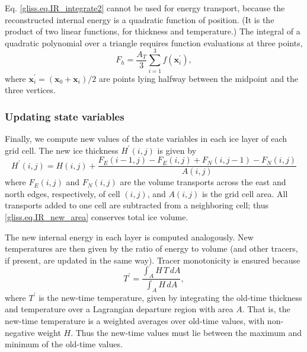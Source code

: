 Eq. \eqref{gliss.eq.IR_integrate2} cannot be used for energy transport, because
the reconstructed internal energy is a quadratic function of position.
(It is the product of two linear functions, for thickness and temperature.)
The integral of a quadratic polynomial over a triangle requires
function evaluations at three points,
\begin{equation}
  \label{gliss.eq.IR_integrate2}
  F_h = \frac{A_T}{3}\sum_{i=1}^3 f\left({\mathbf x}^\prime_i\right),
\end{equation}
where $\mathbf{x}_i^\prime = (\mathbf{x}_0+\mathbf{x}_i)/2$ are
points lying halfway between the midpoint and the three vertices.

\subsubsection{Updating state variables}
\label{sc:glissade-IR-update}

Finally, we compute new values of the state variables in each ice layer of each grid cell.
The new ice thickness $H^\prime(i,j)$ is given by
\begin{equation}
  \label{gliss.eq.IR_new_area}
  H^\prime(i,j) = H(i,j) + 
  \frac{F_{E}(i-1,j) - F_{E}(i,j) + F_{N}(i,j-1) - F_{N}(i,j)} {A(i,j)}
\end{equation}
where $F_{E}(i,j)$ and $F_{N}(i,j)$ are the volume transports across the
east and north edges, respectively, of cell $(i,j)$, and $A(i,j)$
is the grid cell area.   All transports added to one cell are
subtracted from a neighboring cell; thus \eqref{gliss.eq.IR_new_area}
conserves total ice volume.

The new internal energy in each layer is computed analogously.
New temperatures are then given by the ratio of energy to volume
(and other tracers, if present, are updated in the same way).
Tracer monotonicity is ensured because
\[ T^\prime = \frac{\int_A H \, T \, dA} {\int_A H \, dA}, \]
where $T^\prime$ is the new-time temperature, given by 
integrating the old-time thickness and temperature
over a Lagrangian departure region with area $A$. That is,
the new-time temperature is a weighted averages over
old-time values, with non-negative weight $H$. Thus the
new-time values must lie between the maximum and minimum of the
old-time values.



